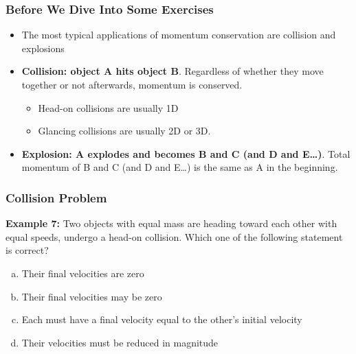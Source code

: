 \documentclass[12pt,compress,aspectratio=169]{beamer}
\begin{document}
%
\begin{frame}
  \frametitle{Before We Dive Into Some Exercises}
  \begin{itemize}
  \item The most typical applications of momentum conservation are collision
    and explosions
  \item\textbf{Collision: object A hits object B}. Regardless of whether they
    move together or not afterwards, momentum is conserved.
    \begin{itemize}
    \item Head-on collisions are usually 1D
    \item Glancing collisions are usually 2D or 3D.
    \end{itemize}
  \item\textbf{Explosion: A explodes and becomes B and C (and D and E\ldots)}.
    Total momentum of B and C (and D and E\ldots) is the same as A in the
    beginning. 
  \end{itemize}
\end{frame}

\begin{frame}
  \frametitle{Collision Problem}
  \textbf{Example 7:} Two objects with equal mass are heading toward each
  other with equal speeds, undergo a head-on collision. Which one of the
  following statement is correct?
  \begin{enumerate}[(a)]
  \item Their final velocities are zero
  \item Their final velocities may be zero
  \item Each must have a final velocity equal to the other's initial velocity
  \item Their velocities must be reduced in magnitude
  \end{enumerate}
\end{frame}
\end{document}
